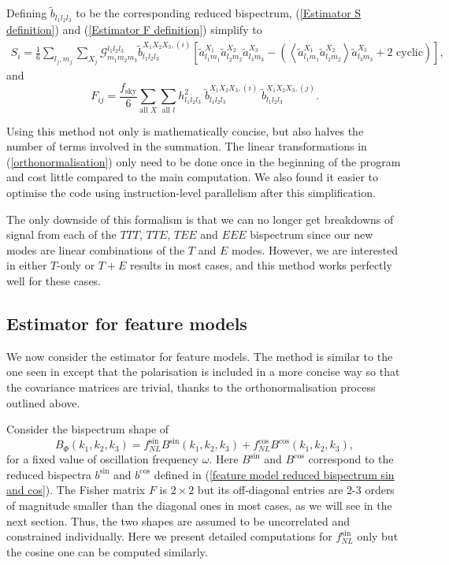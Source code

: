Defining $\tilde{b}_{l_1 l_2 l_3}$ to be the corresponding reduced bispectrum, (\ref{Estimator S definition}) and (\ref{Estimator F definition}) simplify to
\begin{eqnarray}
	S_i =  \frac{1}{6} \sum_{l_j, m_j} \sum_{X_j} \mathcal{G}_{m_1 m_2 m_3}^{l_1 l_2 l_3} \tilde{b}_{l_1 l_2 l_3} ^{X_1 X_2 X_3, (i)} \left[ \tilde{a}_{l_1 m_1}^{X_1} \tilde{a}_{l_2 m_2}^{X_2} \tilde{a}_{l_3 m_3}^{X_3} -  \left( \left< \tilde{a}_{l_1 m_1}^{X_1} \tilde{a}_{l_2 m_2}^{X_2} \right> \tilde{a}_{l_3 m_3}^{X_3} + \text{2 cyclic} \right)   \right],
	\label{KSW estimator S after orthonormalisation}
\end{eqnarray}
and
\begin{equation}
	F_{ij}= \frac{f_\text{sky}}{6} \sum_{\text{all }X} \sum_{\text{all }l} h_{l_1 l_2 l_3}^2 \; \tilde{b}_{l_1 l_2 l_3}^{X_1 X_2 X_3, (i)} \; \tilde{b}_{l_1 l_2 l_3}^{X_1 X_2 X_3, (j)}.
	\label{KSW estimator F after orthonormalisation}
\end{equation}

Using this method not only is mathematically concise, but also halves the number of terms involved in the summation. The linear transformations in (\ref{orthonormalisation}) only need to be done once in the beginning of the program and cost little compared to the main computation. We also found it easier to optimise the code using instruction-level parallelism after this simplification.

The only downside of this formalism is that we can no longer get breakdowns of signal from each of the $TTT$, $TTE$, $TEE$ and $EEE$ bispectrum since our new modes are linear combinations of the $T$ and $E$ modes. However, we are interested in either $T$-only or $T+E$ results in most cases, and this method works perfectly well for these cases.

\subsection{Estimator for feature models}

We now consider the estimator for feature models. The method is similar to the one seen in \cite{Munchmeyer2014} except that the polarisation is included in a more concise way so that the covariance matrices are trivial, thanks to the orthonormalisation process outlined above.

Consider the bispectrum shape of
\begin{equation}
	B_\Phi (k_1, k_2, k_3) = f_{NL}^{\sin} B^{\sin}(k_1, k_2, k_3) + f_{NL}^{\cos} B^{\cos}(k_1, k_2, k_3),
\end{equation}
for a fixed value of oscillation frequency $\omega$. Here $B^{\sin}$ and $B^{\cos}$ correspond to the reduced bispectra $b^{\sin}$ and $b^{\cos}$ defined in (\ref{feature model reduced bispectrum sin and cos}). The Fisher matrix $F$ is $2\times2$ but its off-diagonal entries are 2-3 orders of magnitude smaller than the diagonal ones in most cases, as we will see in the next section. Thus, the two shapes are assumed to be uncorrelated and constrained individually. Here we present detailed computations for $f_{NL}^{\sin}$ only but the cosine one can be computed similarly.


